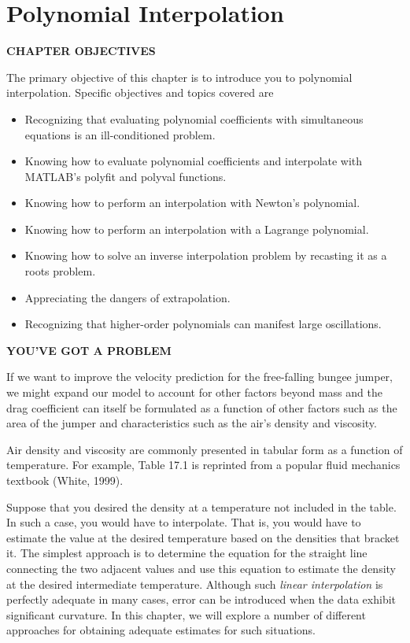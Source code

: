 \documentclass[../main.tex]{subfiles}
\begin{document}
\label{cha:cha_P_17} %
\chapter{Polynomial Interpolation}
\textbf{CHAPTER OBJECTIVES}

\noindent The primary objective of this chapter is to introduce you to polynomial interpolation.
Specific objectives and topics covered are

\begin{itemize}
	\item Recognizing that evaluating polynomial coefficients with simultaneous equations is an ill-conditioned problem.
	\item  Knowing how to evaluate polynomial coefficients and interpolate with MATLAB's polyfit and polyval functions.
	\item  Knowing how to perform an interpolation with Newton's polynomial.
	\item  Knowing how to perform an interpolation with a Lagrange polynomial.
	\item  Knowing how to solve an inverse interpolation problem by recasting it as a roots problem.
	\item  Appreciating the dangers of extrapolation.
	\item  Recognizing that higher-order polynomials can manifest large oscillations.
\end{itemize}

\noindent\textbf{YOU'VE GOT A PROBLEM}

If we want to improve the velocity prediction for the free-falling bungee jumper, we might expand our model to account for other factors beyond mass and the drag coefficient can itself be formulated as a function of other factors such as the area of the jumper and characteristics such as the air's density and viscosity.

Air density and viscosity are commonly presented in tabular form as a function of
temperature. For example, Table 17.1 is reprinted from a popular fluid mechanics textbook
(White, 1999).

Suppose that you desired the density at a temperature not included in the table. In such
a case, you would have to interpolate. That is, you would have to estimate the value at the desired temperature based on the densities that bracket it. The simplest approach is to determine the equation for the straight line connecting the two adjacent values and use this
equation to estimate the density at the desired intermediate temperature. Although such
\textit{linear interpolation} is perfectly adequate in many cases, error can be introduced when the
data exhibit significant curvature. In this chapter, we will explore a number of different
approaches for obtaining adequate estimates for such situations.
\end{document}
